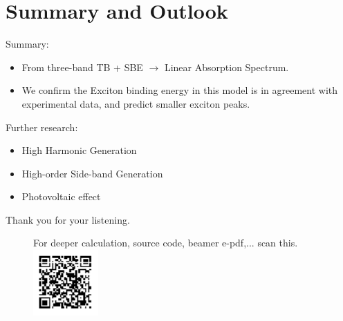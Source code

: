 \documentclass{beamer}
\begin{document}
\section{Summary and Outlook}
\begin{frame}
	\begin{block}{Summary:}
		\begin{itemize}
			\item From three-band TB + SBE $\to $ Linear Absorption Spectrum.\\
			\item We confirm the Exciton binding energy in this model is in agreement with experimental data, and predict smaller exciton peaks.
		\end{itemize}
	\end{block}
	\begin{exampleblock}{Further research:}
		\begin{itemize}
			\item High Harmonic Generation
			\item High-order Side-band Generation
			\item Photovoltaic effect
		\end{itemize}
	\end{exampleblock}
\begin{multicols}{2}
	\begin{center}
		\null\vfill
		Thank you for your listening.
		\null\vfill
	\end{center}\columnbreak
	\begin{figure}
		For deeper calculation, source code, beamer e-pdf,... scan this.\\
		\includegraphics[width = 2.5cm]{images/qrcode.pdf}
	\end{figure}
\end{multicols}
\end{frame}
\begin{frame}
\printbibliography
\end{frame}
\end{document}
